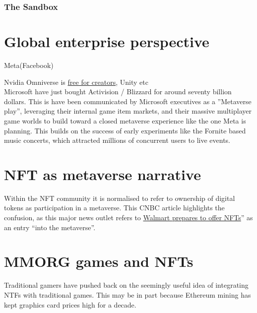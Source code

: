 \subsubsection{The Sandbox}
\section{Global enterprise perspective}
Meta(Facebook)

Nvidia Omniverse is \href{https://www.nvidia.com/en-us/omniverse/creators/}{free for creators}, Unity etc \\

Microsoft have just bought Activision / Blizzard for around seventy billion dollars. This is have been communicated by Microsoft executives as a ''Metaverse play'', leveraging their internal game item markets, and their massive multiplayer game worlds to build toward a closed metaverse experience like the one Meta is planning.
This builds on the success of early experiments like the Fornite based music concerts, which attracted millions of concurrent users to live events.

\section{NFT as metaverse narrative}
Within the NFT community it is normalised to refer to ownership of digital tokens as participation in a metaverse. 
This CNBC article highlights the confusion, as this major news outlet refers to \href{https://www.cnbc.com/2022/01/16/walmart-is-quietly-preparing-to-enter-the-metaverse.html}{Walmart prepares to offer NFTs}'' as an entry ``into the metaverse''.
\section{MMORG games and NFTs}
Traditional gamers have pushed back on the seemingly useful idea of integrating NTFs with traditional games. This may be in part because Ethereum mining has kept graphics card prices high for a decade.

